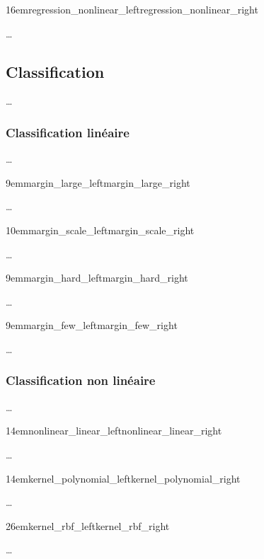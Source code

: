 {16em}{regression_nonlinear_left}{regression_nonlinear_right}

…

\subsection{Classification}

…

\subsubsection{Classification linéaire}

…

{9em}{margin_large_left}{margin_large_right}

…

\bifig{}{}
{10em}{margin_scale_left}{margin_scale_right}

…

\bifig{}{}
{9em}{margin_hard_left}{margin_hard_right}

…

\bifig{}{}
{9em}{margin_few_left}{margin_few_right}

…

\subsubsection{Classification non linéaire}

…

{14em}{nonlinear_linear_left}{nonlinear_linear_right}

…

{14em}{kernel_polynomial_left}{kernel_polynomial_right}

…

{26em}{kernel_rbf_left}{kernel_rbf_right}

…

\cite{csd}

\pagebreak
